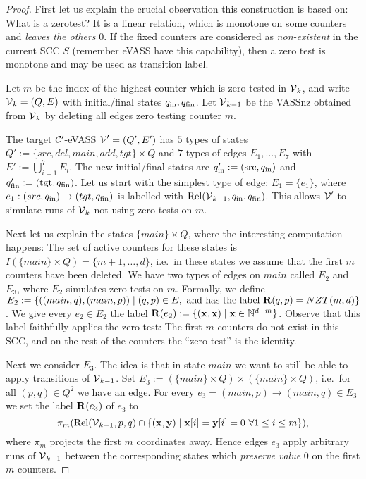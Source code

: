 \begin{proof}
First let us explain the crucial observation this construction is based on: What is a zerotest? It is a linear relation, which is monotone on some counters and \emph{leaves the others} \(0\). If the fixed counters are considered as \emph{non-existent} in the current SCC \(S\) (remember eVASS have this capability), then a zero test is monotone and may be used as transition label.

Let \(m\) be the index of the highest counter which is zero tested in \(\operatorname{\mathcal{V}}_k\), and write \(\operatorname{\mathcal{V}}_k=(Q,E)\) with initial/final states \(q_{\text{in}}, q_{\text{fin}}\). Let \(\operatorname{\mathcal{V}}_{k-1}\) be the VASSnz obtained from \(\operatorname{\mathcal{V}}_k\) by deleting all edges zero testing counter \(m\).

The target \(\mathcal{C}'\)-eVASS \(\operatorname{\mathcal{V}}'=(Q',E')\) has \(5\) types of states \(Q':=\{src, del, main, add, tgt\} \times Q\) and \(7\) types of edges \(E_1, \dots, E_7\) with \(E':=\bigcup_{i=1}^7 E_i\). The new initial/final states are \(q_{\text{in}}':=(\operatorname{src}, q_{\text{in}})\) and \(q_{\text{fin}}':=(\operatorname{tgt}, q_{\text{fin}})\). Let us start with the simplest type of edge: \(E_1=\{e_1\}\), where \(e_1: (src, q_{\text{in}}) \to (tgt,q_{\text{fin}})\) is labelled with \(\operatorname{Rel}(\operatorname{\mathcal{V}}_{k-1}, q_{\text{in}}, q_{\text{fin}})\). This allows \(\operatorname{\mathcal{V}}'\) to simulate runs of \(\operatorname{\mathcal{V}}_k\) not using zero tests on \(m\).

Next let us explain the states \(\{main\} \times Q\), where the interesting computation happens: The set of active counters for these states is \(I(\{main\} \times Q)=\{m+1,\dots, d\}\), i.e.\ in these states we assume that the first \(m\) counters have been deleted. We have two types of edges on \(main\) called \(E_2\) and \(E_3\), where \(E_2\) simulates zero tests on \(m\). Formally, we define \(E_2:=\{((main,q), (main,p)) \mid (q,p) \in E, \text{ and has the label }\mathbf{R}(q,p)=NZT(m,d)\}\). We give every \(e_2 \in E_2\) the label \(\mathbf{R}(e_2):=\{(\mathbf{x}, \mathbf{x}) \mid \mathbf{x} \in \mathbb{N}^{d-m}\}\). Observe that this label faithfully applies the zero test: The first \(m\) counters do not exist in this SCC, and on the rest of the counters the ``zero test'' is the identity.

Next we consider \(E_3\). The idea is that in state \(main\) we want to still be able to apply transitions of \(\operatorname{\mathcal{V}}_{k-1}\). Set \(E_3:=(\{main\} \times Q) \times (\{main\} \times Q)\), i.e.\ for all \((p,q) \in Q^2\) we have an edge.  For every \(e_3=(main, p) \to (main, q) \in E_3\) we set the label \(\mathbf{R}(e_3)\) of \(e_3\) to
\[\pi_m(\operatorname{Rel}(\operatorname{\mathcal{V}}_{k-1}, p, q) \cap \{(\mathbf{x}, \mathbf{y}) \mid \mathbf{x}[i]=\mathbf{y}[i]=0\ \forall 1 \leq i \leq m\}),\] where \(\pi_m\) projects the first \(m\) coordinates away. Hence edges \(e_3\) apply arbitrary runs of \(\operatorname{\mathcal{V}}_{k-1}\) between the corresponding states which \emph{preserve value} \(0\) on the first \(m\) counters.


\end{proof}
